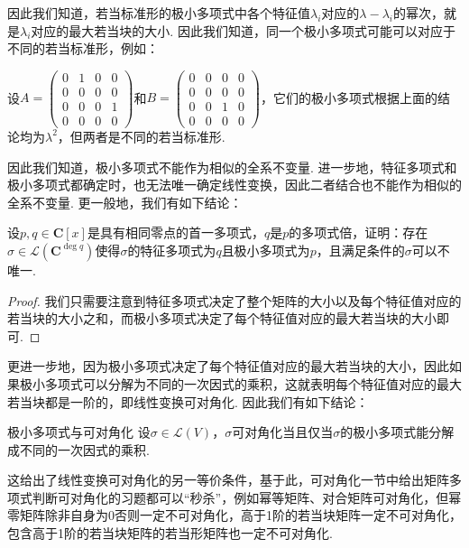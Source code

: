 因此我们知道，若当标准形的极小多项式中各个特征值$\lambda_i$对应的$\lambda-\lambda_i$的幂次，就是$\lambda_i$对应的最大若当块的大小. 因此我们知道，同一个极小多项式可能可以对应于不同的若当标准形，例如：
\begin{example}{}{}
    设$A=\begin{pmatrix}
            0 & 1 & 0 & 0 \\ 0 & 0 & 0 & 0 \\ 0 & 0 & 0 & 1 \\ 0 & 0 & 0 & 0
        \end{pmatrix}$和$B=\begin{pmatrix}
            0 & 0 & 0 & 0 \\ 0 & 0 & 0 & 0 \\ 0 & 0 & 1 & 0 \\ 0 & 0 & 0 & 0
        \end{pmatrix}$，它们的极小多项式根据上面的结论均为$\lambda^2$，但两者是不同的若当标准形.
\end{example}

因此我们知道，极小多项式不能作为相似的全系不变量. 进一步地，特征多项式和极小多项式都确定时，也无法唯一确定线性变换，因此二者结合也不能作为相似的全系不变量. 更一般地，我们有如下结论：
\begin{example}{}{}
    设$p,q\in\mathbf{C}[x]$是具有相同零点的首一多项式，$q$是$p$的多项式倍，证明：存在$\sigma\in \mathcal{L}(\mathbf{C}^{\deg q})$使得$\sigma$的特征多项式为$q$且极小多项式为$p$，且满足条件的$\sigma$可以不唯一.
\end{example}
\begin{proof}
    我们只需要注意到特征多项式决定了整个矩阵的大小以及每个特征值对应的若当块的大小之和，而极小多项式决定了每个特征值对应的最大若当块的大小即可.
\end{proof}

更进一步地，因为极小多项式决定了每个特征值对应的最大若当块的大小，因此如果极小多项式可以分解为不同的一次因式的乘积，这就表明每个特征值对应的最大若当块都是一阶的，即线性变换可对角化. 因此我们有如下结论：
\begin{theorem}{}{极小多项式与可对角化}
    设$\sigma\in \mathcal{L}(V)$，$\sigma$可对角化当且仅当$\sigma$的极小多项式能分解成不同的一次因式的乘积.
\end{theorem}

这给出了线性变换可对角化的另一等价条件，基于此，可对角化一节中给出矩阵多项式判断可对角化的习题都可以``秒杀''，例如幂等矩阵、对合矩阵可对角化，但幂零矩阵除非自身为0否则一定不可对角化，高于1阶的若当块矩阵一定不可对角化，包含高于1阶的若当块矩阵的若当形矩阵也一定不可对角化.

